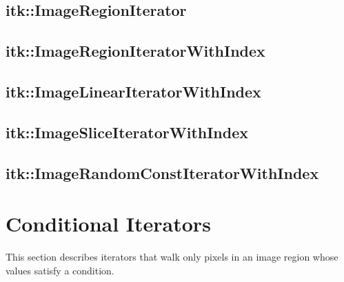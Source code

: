 
\subsection{itk::ImageRegionIterator}
\label{sec:itkImageRegionIterator}


\subsection{itk::ImageRegionIteratorWithIndex}
\label{sec:itkImageRegionIteratorWithIndex}


\subsection{itk::ImageLinearIteratorWithIndex}
\label{sec:itkImageLinearIteratorWithIndex}


\subsection{itk::ImageSliceIteratorWithIndex}
\label{sec:itkImageSliceIteratorWithIndex}


\subsection{itk::ImageRandomConstIteratorWithIndex}
\label{sec:itkImageRandomConstIteratorWithIndex}



\section{Conditional Iterators}
\label{sec:ConditionalIterators}
This section describes iterators that walk only pixels in an image region whose
values satisfy a condition.





%

